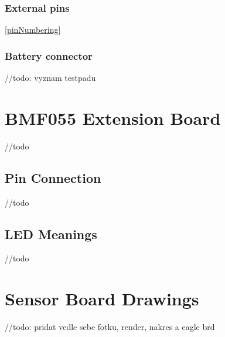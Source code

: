 \subsubsection{External pins} \ref{pinNumbering}
\subsubsection{Battery connector}

//todo: vyznam testpadu

\section{BMF055 Extension Board}
\label{BMF055pinNumbering}
//todo

\subsection{Pin Connection}
//todo

\subsection{LED Meanings}
//todo



\section{Sensor Board Drawings}
//todo: pridat vedle sebe fotku, render, nakres a eagle brd

